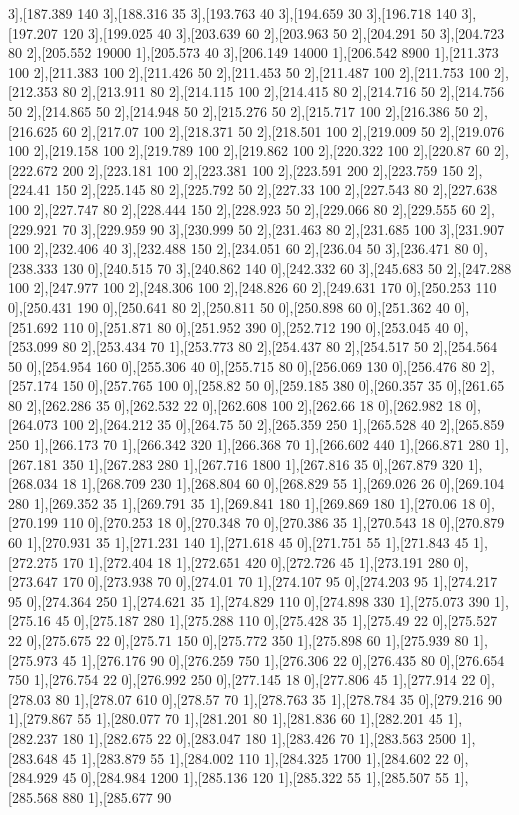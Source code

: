 {3],[187.389 140 3],[188.316 35 3],[193.763 40 3],[194.659 30 3],[196.718 140 3],[197.207 120 3],[199.025 40 3],[203.639 60 2],[203.963 50 2],[204.291 50 3],[204.723 80 2],[205.552 19000 1],[205.573 40 3],[206.149 14000 1],[206.542 8900 1],[211.373 100 2],[211.383 100 2],[211.426 50 2],[211.453 50 2],[211.487 100 2],[211.753 100 2],[212.353 80 2],[213.911 80 2],[214.115 100 2],[214.415 80 2],[214.716 50 2],[214.756 50 2],[214.865 50 2],[214.948 50 2],[215.276 50 2],[215.717 100 2],[216.386 50 2],[216.625 60 2],[217.07 100 2],[218.371 50 2],[218.501 100 2],[219.009 50 2],[219.076 100 2],[219.158 100 2],[219.789 100 2],[219.862 100 2],[220.322 100 2],[220.87 60 2],[222.672 200 2],[223.181 100 2],[223.381 100 2],[223.591 200 2],[223.759 150 2],[224.41 150 2],[225.145 80 2],[225.792 50 2],[227.33 100 2],[227.543 80 2],[227.638 100 2],[227.747 80 2],[228.444 150 2],[228.923 50 2],[229.066 80 2],[229.555 60 2],[229.921 70 3],[229.959 90 3],[230.999 50 2],[231.463 80 2],[231.685 100 3],[231.907 100 2],[232.406 40 3],[232.488 150 2],[234.051 60 2],[236.04 50 3],[236.471 80 0],[238.333 130 0],[240.515 70 3],[240.862 140 0],[242.332 60 3],[245.683 50 2],[247.288 100 2],[247.977 100 2],[248.306 100 2],[248.826 60 2],[249.631 170 0],[250.253 110 0],[250.431 190 0],[250.641 80 2],[250.811 50 0],[250.898 60 0],[251.362 40 0],[251.692 110 0],[251.871 80 0],[251.952 390 0],[252.712 190 0],[253.045 40 0],[253.099 80 2],[253.434 70 1],[253.773 80 2],[254.437 80 2],[254.517 50 2],[254.564 50 0],[254.954 160 0],[255.306 40 0],[255.715 80 0],[256.069 130 0],[256.476 80 2],[257.174 150 0],[257.765 100 0],[258.82 50 0],[259.185 380 0],[260.357 35 0],[261.65 80 2],[262.286 35 0],[262.532 22 0],[262.608 100 2],[262.66 18 0],[262.982 18 0],[264.073 100 2],[264.212 35 0],[264.75 50 2],[265.359 250 1],[265.528 40 2],[265.859 250 1],[266.173 70 1],[266.342 320 1],[266.368 70 1],[266.602 440 1],[266.871 280 1],[267.181 350 1],[267.283 280 1],[267.716 1800 1],[267.816 35 0],[267.879 320 1],[268.034 18 1],[268.709 230 1],[268.804 60 0],[268.829 55 1],[269.026 26 0],[269.104 280 1],[269.352 35 1],[269.791 35 1],[269.841 180 1],[269.869 180 1],[270.06 18 0],[270.199 110 0],[270.253 18 0],[270.348 70 0],[270.386 35 1],[270.543 18 0],[270.879 60 1],[270.931 35 1],[271.231 140 1],[271.618 45 0],[271.751 55 1],[271.843 45 1],[272.275 170 1],[272.404 18 1],[272.651 420 0],[272.726 45 1],[273.191 280 0],[273.647 170 0],[273.938 70 0],[274.01 70 1],[274.107 95 0],[274.203 95 1],[274.217 95 0],[274.364 250 1],[274.621 35 1],[274.829 110 0],[274.898 330 1],[275.073 390 1],[275.16 45 0],[275.187 280 1],[275.288 110 0],[275.428 35 1],[275.49 22 0],[275.527 22 0],[275.675 22 0],[275.71 150 0],[275.772 350 1],[275.898 60 1],[275.939 80 1],[275.973 45 1],[276.176 90 0],[276.259 750 1],[276.306 22 0],[276.435 80 0],[276.654 750 1],[276.754 22 0],[276.992 250 0],[277.145 18 0],[277.806 45 1],[277.914 22 0],[278.03 80 1],[278.07 610 0],[278.57 70 1],[278.763 35 1],[278.784 35 0],[279.216 90 1],[279.867 55 1],[280.077 70 1],[281.201 80 1],[281.836 60 1],[282.201 45 1],[282.237 180 1],[282.675 22 0],[283.047 180 1],[283.426 70 1],[283.563 2500 1],[283.648 45 1],[283.879 55 1],[284.002 110 1],[284.325 1700 1],[284.602 22 0],[284.929 45 0],[284.984 1200 1],[285.136 120 1],[285.322 55 1],[285.507 55 1],[285.568 880 1],[285.677 90 }
